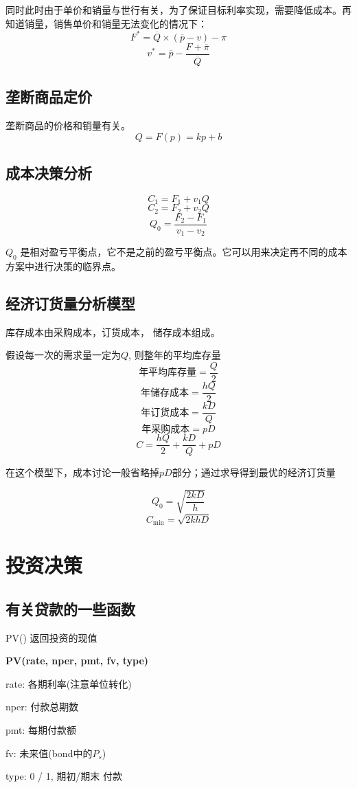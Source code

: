 \documentclass[10pt, a4paper]{article}
\begin{document}
        同时此时由于单价和销量与世行有关，为了保证目标利率实现，需要降低成本。再知道销量，销售单价和销量无法变化的情况下： 
        $$F^{*} = \overline{Q} \times (\overline{p} - v) - \pi$$
        $$v^{*} = \overline{p} - \frac{F + \overline{\pi}}{\overline{Q}}$$
    \subsection{垄断商品定价}
        垄断商品的价格和销量有关。 
            $$Q = F(p) = kp + b$$
    \subsection{成本决策分析}
        $$C_1 = F_1 + v_1Q$$
        $$C_2 = F_2 + v_2Q$$
        $$Q_0 = \frac{F_2 - F_1}{v_1 - v_2}$$

        $Q_0$ 是相对盈亏平衡点，它不是之前的盈亏平衡点。它可以用来决定再不同的成本方案中进行决策的临界点。 

    \subsection{经济订货量分析模型}
        库存成本由采购成本，订货成本， 储存成本组成。

        假设每一次的需求量一定为$Q$, 则整年的平均库存量
        $$\text{年平均库存量} = \frac{Q}{2}$$
        $$\text{年储存成本} = \frac{hQ}{2}$$
        $$\text{年订货成本} = \frac{kD}{Q}$$
        $$\text{年采购成本} = pD$$
        $$C = \frac{hQ}{2} + \frac{kD}{Q} + pD$$


        在这个模型下，成本讨论一般省略掉$pD$部分；通过求导得到最优的经济订货量

        $$Q_0 = \sqrt{\frac{2kD}{h}}$$
        $$C_{\text{min}} = \sqrt{2khD}$$

\section{投资决策}

\subsection{有关贷款的一些函数}
PV() 返回投资的现值
\begin{center}
    \textbf{PV(rate, nper, pmt, fv, type)}
    
    rate: 各期利率(注意单位转化)
    
    nper: 付款总期数

    pmt: 每期付款额

    fv: 未来值(bond中的$P_s$)

    type: 0 / 1, 期初/期末 付款

\end{center}
\end{document}
